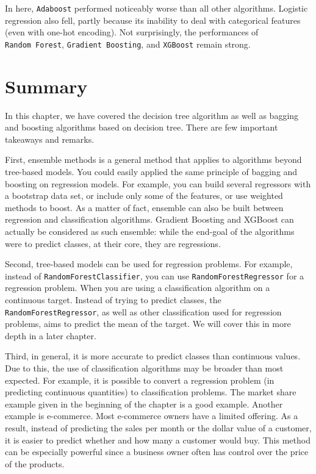 \documentclass[
]{book}
\theoremstyle{definition}
\theoremstyle{definition}
\theoremstyle{definition}
\theoremstyle{definition}
\theoremstyle{remark}
\begin{document}
In here, \texttt{Adaboost} performed noticeably worse than all other algorithms. Logistic regression also fell, partly because its inability to deal with categorical features (even with one-hot encoding). Not surprisingly, the performances of \texttt{Random\ Forest}, \texttt{Gradient\ Boosting}, and \texttt{XGBoost} remain strong.

\hypertarget{summary}{%
\section{Summary}\label{summary}}

In this chapter, we have covered the decision tree algorithm as well as bagging and boosting algorithms based on decision tree. There are few important takeaways and remarks.

First, ensemble methods is a general method that applies to algorithms beyond tree-based models. You could easily applied the same principle of bagging and boosting on regression models. For example, you can build several regressors with a bootstrap data set, or include only some of the features, or use weighted methods to boost. As a matter of fact, ensemble can also be built between regression and classification algorithms. Gradient Boosting and XGBoost can actually be considered as such ensemble: while the end-goal of the algorithms were to predict classes, at their core, they are regressions.

Second, tree-based models can be used for regression problems. For example, instead of \texttt{RandomForestClassifier}, you can use \texttt{RandomForestRegressor} for a regression problem. When you are using a classification algorithm on a continuous target. Instead of trying to predict classes, the \texttt{RandomForestRegressor}, as well as other classification used for regression problems, aims to predict the mean of the target. We will cover this in more depth in a later chapter.

Third, in general, it is more accurate to predict classes than continuous values. Due to this, the use of classification algorithms may be broader than most expected. For example, it is possible to convert a regression problem (in predicting continuous quantities) to classification problems. The market share example given in the beginning of the chapter is a good example. Another example is e-commerce. Most e-commerce owners have a limited offering. As a result, instead of predicting the sales per month or the dollar value of a customer, it is easier to predict whether and how many a customer would buy. This method can be especially powerful since a business owner often has control over the price of the products.
\end{document}
